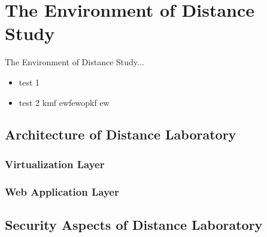 \section{The Environment of Distance Study}
\label{The Environment of Distance Study}
The Environment of Distance Study...
\begin{itemize}
	\item test 1
	\item test 2 kmf ewfewopkf ew
\end{itemize}

\subsection{Architecture of Distance Laboratory}

\subsubsection{Virtualization Layer}

\subsubsection{Web Application Layer}

\subsection{Security Aspects of Distance Laboratory}
